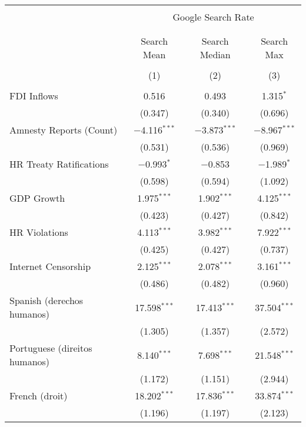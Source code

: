 
\begin{table}[!htbp] \centering 
  \caption{} 
  \label{} 
\begin{tabular}{@{\extracolsep{5pt}}lccc} 
\\[-1.8ex]\hline 
\hline \\[-1.8ex] 
 & \multicolumn{3}{c}{Google Search Rate} \\ 
\cline{2-4} 
\\[-1.8ex] & \multicolumn{3}{c}{ } \\ 
 & Search Mean & Search Median & Search Max \\ 
\\[-1.8ex] & (1) & (2) & (3)\\ 
\hline \\[-1.8ex] 
 FDI Inflows & 0.516 & 0.493 & 1.315$^{*}$ \\ 
  & (0.347) & (0.340) & (0.696) \\ 
  Amnesty Reports (Count) & $-$4.116$^{***}$ & $-$3.873$^{***}$ & $-$8.967$^{***}$ \\ 
  & (0.531) & (0.536) & (0.969) \\ 
  HR Treaty Ratifications & $-$0.993$^{*}$ & $-$0.853 & $-$1.989$^{*}$ \\ 
  & (0.598) & (0.594) & (1.092) \\ 
  GDP Growth & 1.975$^{***}$ & 1.902$^{***}$ & 4.125$^{***}$ \\ 
  & (0.423) & (0.427) & (0.842) \\ 
  HR Violations & 4.113$^{***}$ & 3.982$^{***}$ & 7.922$^{***}$ \\ 
  & (0.425) & (0.427) & (0.737) \\ 
  Internet Censorship & 2.125$^{***}$ & 2.078$^{***}$ & 3.161$^{***}$ \\ 
  & (0.486) & (0.482) & (0.960) \\ 
  Spanish (derechos humanos) & 17.598$^{***}$ & 17.413$^{***}$ & 37.504$^{***}$ \\ 
  & (1.305) & (1.357) & (2.572) \\ 
  Portuguese (direitos humanos) & 8.140$^{***}$ & 7.698$^{***}$ & 21.548$^{***}$ \\ 
  & (1.172) & (1.151) & (2.944) \\ 
  French (droit) & 18.202$^{***}$ & 17.836$^{***}$ & 33.874$^{***}$ \\ 
  & (1.196) & (1.197) & (2.123) \\ 

\end{tabular}
\end{table}
